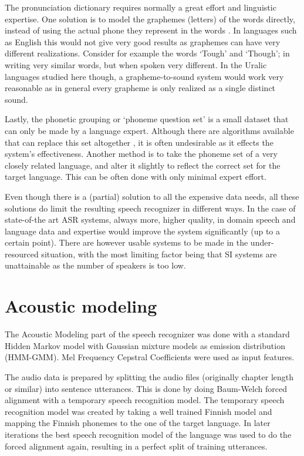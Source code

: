 \documentclass[b5paper]{article}
\begin{document}
The pronunciation dictionary requires normally a great effort and linguistic expertise. One solution is to model the graphemes (letters) of the words directly, instead of using the actual phone they represent in the words \cite{kanthak2003multilingual}. In languages such as English this would not give very good results as graphemes can have very different realizations. Consider for example the words `Tough' and `Though'; in writing very similar words, but when spoken very different. In the Uralic languages studied here though, a grapheme-to-sound system would work very reasonable as in general every grapheme is only realized as a single distinct sound.

Lastly, the phonetic grouping or `phoneme question set' is a small dataset that can only be made by a language expert. Although there are algorithms available that can replace this set altogether \cite{darjaa2011effective}, it is often undesirable as it effects the system's effectiveness. Another method is to take the phoneme set of a very closely related language, and alter it slightly to reflect the correct set for the target language. This can be often done with only minimal expert effort.

Even though there is a (partial) solution to all the expensive data needs, all these solutions do limit the resulting speech recognizer in different ways. In the case of state-of-the art ASR systems, always more, higher quality, in domain speech and language data and expertise would improve the system significantly (up to a certain point). There are however usable systems to be made in the under-resourced situation, with the most limiting factor being that SI systems are unattainable as the number of speakers is too low.


\section{Acoustic modeling}
\label{sec:align}
The Acoustic Modeling part of the speech recognizer was done with a standard Hidden Markov model with Gaussian mixture models as emission distribution (HMM-GMM). Mel Frequency Cepstral Coefficients were used as input features. \cite{hirsimaki2009importance}

The audio data is prepared by splitting the audio files (originally chapter length or similar) into sentence utterances. This is done by doing Baum-Welch forced alignment with a temporary speech recognition model. The temporary speech recognition model was created by taking a well trained Finnish model and mapping the Finnish phonemes to the one of the target language. In later iterations the best speech recognition model of the language was used to do the forced alignment again, resulting in a perfect split of training utterances.
\end{document}
